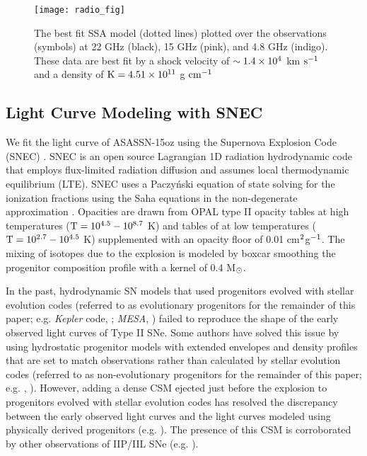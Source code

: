 \documentclass[a4paper,fleqn,usenatbib]{mnras}
\newcommand{\msunperiod}{M$\rm{_{\odot}}$}
\begin{document}
\begin{figure}
\begin{center}
\texttt{[image: radio\_fig]}
\caption{The best fit SSA model (dotted lines) plotted over the observations (symbols) at 22 GHz (black), 15 GHz (pink), and 4.8 GHz (indigo).
These data are best fit by a shock velocity of $\rm{\sim 1.4\times10^{4}}$ km $\rm{s^{-1}}$ and a density of $\rm{K = 4.51\times 10^{11}}$ g $\rm{cm^{-1}}$}
\label{fig:radio}
\end{center}
\end{figure}
\subsection{Light Curve Modeling with SNEC}\label{sec:LCmodeling}
We fit the light curve of ASASSN-15oz using the Supernova Explosion Code (SNEC) \citep{2015morozova}.
SNEC is an open source Lagrangian 1D radiation hydrodynamic code that employs flux-limited radiation diffusion and assumes local thermodynamic equilibrium (LTE).
SNEC uses a Paczy\'nski equation of state \citep{1983paczynski} solving for the ionization fractions using the Saha equations in the non-degenerate approximation \citep{2000zaghloul}. 
Opacities are drawn from OPAL type II opacity tables \citep{1996iglesias} at high temperatures ($\rm{T=10^{4.5}-10^{8.7}}$ K) and tables of \citet{2005ferguson} at low temperatures ($\rm{T = 10^{2.7}-10^{4.5}}$ K) supplemented with an opacity floor of 0.01 cm$\rm{^2}$g$\rm{^{-1}}$. 
The mixing of isotopes due to the explosion is modeled by boxcar smoothing the progenitor composition profile with a kernel of 0.4 \msunperiod.

In the past, hydrodynamic SN models that used progenitors evolved with stellar evolution codes (referred to as evolutionary progenitors for the remainder of this paper; e.g. {\it Kepler} code, \citealt{1978weaver,2007woosley,2015woosley, 2014sukhbold,2016sukhbold}; {\it MESA}, \citealt{2018paxton}) failed to reproduce the shape of the early observed light curves of Type II SNe. 
Some authors have solved this issue by using hydrostatic progenitor models with extended envelopes and density profiles that are set to match observations rather than calculated by stellar evolution codes (referred to as non-evolutionary progenitors for the remainder of this paper; e.g. \citealt{2008utrobin}, \citealt{2017utrobin}). 
However, adding a dense CSM ejected just before the explosion to progenitors evolved with stellar evolution codes has resolved the discrepancy between the early observed light curves and the light curves modeled using physically derived progenitors (e.g. \citealt{2018morozova,2015gezari,2018foerster}).
The presence of this CSM is corroborated by other observations of IIP/IIL SNe (e.g. \citealt{2017yaron,2018bullivant}).
\end{document}
